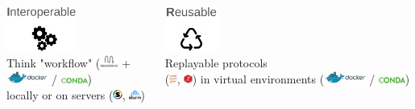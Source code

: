 \begin{frame}{\FAIRB}
\begin{columns}[t]
  \begin{column}{.25\textwidth}
     \begin{center}
     \includegraphics[height=1.5cm]{01_introduction/images/logo-FAIR-I.png}\\Think "workflow" (\includegraphics[height=0.4cm]{shared/logo-snakemake.png} +\\ \includegraphics[height=0.4cm]{shared/logo-docker-paysage.png} / \includegraphics[height=0.2cm]{shared/logo-conda.png})\\locally or on servers (\includegraphics[height=0.3cm]{shared/logo-singularity.png}, \includegraphics[height=0.3cm]{shared/logo-slurm.png})
     \end{center}
  \end{column}
  \begin{column}{.25\textwidth}
     \begin{center}
     \includegraphics[height=1.5cm]{01_introduction/images/logo-FAIR-R.png}\\Replayable protocols\\(\includegraphics[height=0.3cm]{shared/logo-jupyter.png}, \includegraphics[height=0.3cm]{shared/logo-Rmarkdown.png}) in virtual environments (\includegraphics[height=0.4cm]{shared/logo-docker-paysage.png} / \includegraphics[height=0.2cm]{shared/logo-conda.png})

\end{center}
\end{column}
\end{columns}
\end{frame}
